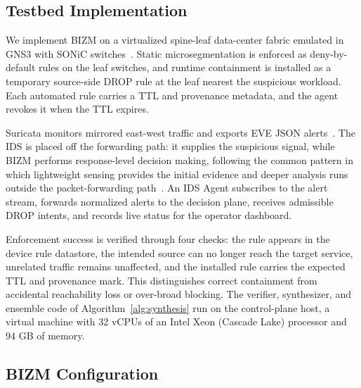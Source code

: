 \documentclass[final,5p]{elsarticle}
\begin{document}
\subsection{Testbed Implementation}
\label{sec:testbed_implementation}

We implement BIZM on a virtualized spine-leaf data-center fabric emulated in GNS3 with SONiC switches~\cite{sonic2026}. Static microsegmentation is enforced as deny-by-default rules on the leaf switches, and runtime containment is installed as a temporary source-side DROP rule at the leaf nearest the suspicious workload. Each automated rule carries a TTL and provenance metadata, and the agent revokes it when the TTL expires.

Suricata monitors mirrored east-west traffic and exports EVE JSON alerts~\cite{oisf2026suricata}. The IDS is placed off the forwarding path: it supplies the suspicious signal, while BIZM performs response-level decision making, following the common pattern in which lightweight sensing provides the initial evidence and deeper analysis runs outside the packet-forwarding path~\cite{cSDAID22,jSAID23,jAPELID24}. An IDS Agent subscribes to the alert stream, forwards normalized alerts to the decision plane, receives admissible DROP intents, and records live status for the operator dashboard.

Enforcement success is verified through four checks: the rule appears in the device rule datastore, the intended source can no longer reach the target service, unrelated traffic remains unaffected, and the installed rule carries the expected TTL and provenance mark. This distinguishes correct containment from accidental reachability loss or over-broad blocking. The verifier, synthesizer, and ensemble code of Algorithm~\ref{alg:synthesis} run on the control-plane host, a virtual machine with 32 vCPUs of an Intel Xeon (Cascade Lake) processor and 94 GB of memory.

\subsection{BIZM Configuration}
\label{sec:runtime_configuration}
\end{document}
